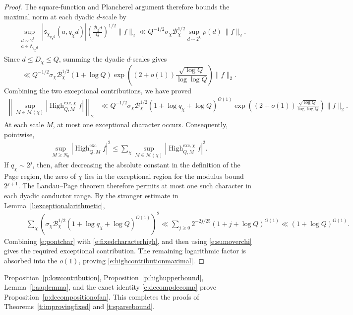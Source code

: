 \documentclass[12pt,reqno]{amsart}
\numberwithin{equation}{section}
\theoremstyle{definition}
\theoremstyle{remark}
\begin{document}
\begin{proof}
The square-function and Plancherel argument therefore bounds the
maximal norm at each dyadic \(d\)-scale by
\begin{align*}
 &\sup_{\substack{d\sim2^k\\a\in\mathbb A_{q_\chi d}}}
 |\mathfrak s_{\chi_{q_\chi d}}(a,q_\chi d)|
 \left(\frac{\mathcal B_\chi d}{Q}\right)^{1/2}\|f\|_2\ll
 Q^{-1/2}\sigma_\chi\mathcal B_\chi^{1/2}
 \sup_{d\sim2^k}\rho(d)\,\|f\|_2.
\end{align*}
Since \(d\leq D_\chi\leq Q\), summing the dyadic \(d\)-scales gives
\[
 \ll
 Q^{-1/2}\sigma_\chi\mathcal B_\chi^{1/2}
 (1+\log Q)
 \exp\left(
 (2+o(1))\frac{\sqrt{\log Q}}{\log\log Q}
 \right)\|f\|_2.
\]
Combining the two exceptional contributions, we have proved
\begin{align}\label{e:fixedcharacterhigh}
 \left\|
 \sup_{M\in\mathcal M(\chi)}
 |\operatorname{High}^{\mathrm{exc},\chi}_{Q,M}f|
 \right\|_2
 &\ll
 Q^{-1/2}\sigma_\chi\mathcal B_\chi^{1/2}
 (1+\log q_\chi+\log Q)^{O(1)}
 \exp\left(
 (2+o(1))\frac{\sqrt{\log Q}}{\log\log Q}
 \right)\|f\|_2.
\end{align}
At each scale \(M\), at most one exceptional character occurs.
Consequently, pointwise,
\begin{align}\label{e:pontchar}
 \sup_{M\geq N_0}
 |\operatorname{High}^{\mathrm{exc}}_{Q,M}f|^2
 \leq
 \sum_\chi
 \sup_{M\in\mathcal M(\chi)}
 |\operatorname{High}^{\mathrm{exc},\chi}_{Q,M}f|^2.
\end{align}
If \(q_\chi\sim2^j\), then, after decreasing the absolute constant in
the definition of the Page region, the zero of \(\chi\) lies in the
exceptional region for the modulus bound \(2^{j+1}\).  The
Landau--Page theorem therefore permits at most one such character in
each dyadic conductor range.  By the stronger estimate in
Lemma~\ref{l:exceptionalarithmetic},
\begin{align}\qquad\label{e:sumoverchi}
 &\sum_\chi
 \left(
 \sigma_\chi\mathcal B_\chi^{1/2}
 (1+\log q_\chi+\log Q)^{O(1)}
 \right)^2\ll
 \sum_{j\geq0}
 2^{-2j/25}(1+j+\log Q)^{O(1)}
 \ll(1+\log Q)^{O(1)}.
\end{align}
Combining \eqref{e:pontchar} with
\eqref{e:fixedcharacterhigh}, and then using \eqref{e:sumoverchi} gives the required exceptional contribution.  The
remaining logarithmic factor is absorbed into the \(o(1)\), proving
\eqref{e:highcontributionmaximal}.
\end{proof}

Proposition~\ref{p:lowcontribution},
Proposition~\ref{p:highupperbound}, Lemma~\ref{l:aaplemma}, and the
exact identity \eqref{e:decompdecomp} prove
Proposition~\ref{p:decompositionofan}.  This completes the proofs of
Theorems~\ref{t:improvingfixed} and \ref{t:sparsebound}.
\end{document}
